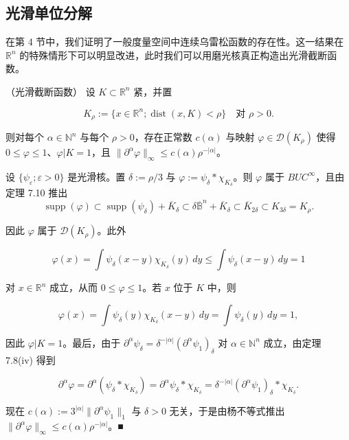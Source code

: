 \subsection*{光滑单位分解}

在第 4 节中，我们证明了一般度量空间中连续乌雷松函数的存在性。这一结果在 $ \mathbb{R}^{n} $ 的特殊情形下可以明显改进，此时我们可以用磨光核真正构造出光滑截断函数。

\begin{proposition}

（光滑截断函数） 设 $ K \subset \mathbb{R}^{n} $ 紧，并置

\[
K_{\rho} := \{x \in \mathbb{R}^{n} ; \operatorname{dist}(x,K) < \rho\} \quad \text{对 } \rho > 0 .
\]

则对每个 $ \alpha \in \mathbb{N}^{n} $ 与每个 $ \rho > 0 $，存在正常数 $ c(\alpha) $ 与映射 $ \varphi \in \mathcal{D}(K_{\rho}) $ 使得 $ 0 \le \varphi \le 1 $、$ \varphi|K = 1 $，且 $ \|\partial^{\alpha}\varphi\|_{\infty} \le c(\alpha)\rho^{-|\alpha|} $。

\proofhead
设 $ \{\psi_{\varepsilon} ; \varepsilon > 0\} $ 是光滑核。置 $ \delta := \rho/3 $ 与 $ \varphi := \psi_{\delta} * \chi_{K_{\delta}} $。则 $ \varphi $ 属于 $ BUC^{\infty} $，且由定理 7.10 推出
\[
\operatorname{supp}(\varphi) \subset \operatorname{supp}(\psi_{\delta}) + \overline{K}_{\delta} \subset \delta\overline{\mathbb{B}}^{n} + \overline{K}_{\delta} \subset \overline{K}_{2\delta} \subset K_{3\delta} = K_{\rho} .
\]

因此 $ \varphi $ 属于 $ \mathcal{D}(K_{\rho}) $。此外

\[
\varphi(x) = \int\psi_{\delta}(x - y)\chi_{K_{\delta}}(y)\,dy \le \int\psi_{\delta}(x - y)\,dy = 1
\]

对 $ x \in \mathbb{R}^{n} $ 成立，从而 $ 0 \le \varphi \le 1 $。若 $ x $ 位于 $ K $ 中，则

\[
\varphi(x) = \int\psi_{\delta}(y)\chi_{K_{\delta}}(x - y)\,dy = \int\psi_{\delta}(y)\,dy = 1 ,
\]

因此 $ \varphi|K = 1 $。最后，由于 $ \partial^{\alpha}\psi_{\delta} = \delta^{-|\alpha|}(\partial^{\alpha}\psi_{1})_{\delta} $ 对 $ \alpha \in \mathbb{N}^{n} $ 成立，由定理 7.8(iv) 得到

\[
\partial^{\alpha}\varphi = \partial^{\alpha}(\psi_{\delta} * \chi_{K_{\delta}}) = \partial^{\alpha}\psi_{\delta} * \chi_{K_{\delta}} = \delta^{-|\alpha|}(\partial^{\alpha}\psi_{1})_{\delta} * \chi_{K_{\delta}} .
\]

现在 $ c(\alpha) := 3^{|\alpha|}\|\partial^{\alpha}\psi_{1}\|_{1} $ 与 $ \delta > 0 $ 无关，于是由杨不等式推出 $ \|\partial^{\alpha}\varphi\|_{\infty} \le c(\alpha)\rho^{-|\alpha|} $。\nobreak\hspace{0.35em}■

\end{proposition}

